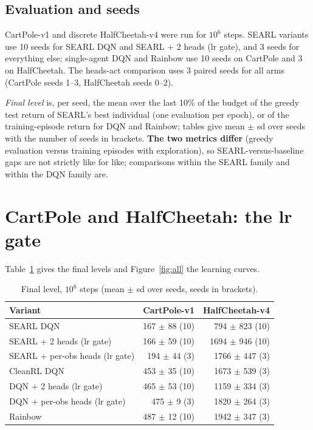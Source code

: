 \documentclass[11pt]{article}
\begin{document}
\subsection{Evaluation and seeds}
CartPole-v1 and discrete HalfCheetah-v4 were run for $10^6$ steps. SEARL variants use 10 seeds for
SEARL DQN and SEARL + 2 heads (lr gate), and 3 seeds for everything else; single-agent DQN and Rainbow use 10 seeds on
CartPole and 3 on HalfCheetah. The heads-act comparison uses 3 paired seeds for all arms (CartPole seeds 1--3,
HalfCheetah seeds 0--2).

\emph{Final level} is, per seed, the mean over the last 10\% of the budget of the greedy test return of SEARL's best
individual (one evaluation per epoch), or of the training-episode return for DQN and Rainbow; tables give mean $\pm$ sd
over seeds with the number of seeds in brackets. \textbf{The two metrics differ} (greedy evaluation versus training
episodes with exploration), so SEARL-versus-baseline gaps are not strictly like for like; comparisons within the SEARL
family and within the DQN family are.

\section{CartPole and HalfCheetah: the lr gate}
Table~\ref{tab:main} gives the final levels and Figure~\ref{fig:all} the learning curves.

\begin{table}[h]
\centering\small
\begin{tabular}{lrr}
\toprule
Variant & CartPole-v1 & HalfCheetah-v4 \\
\midrule
SEARL DQN & 167 $\pm$ 88 (10) & 794 $\pm$ 823 (10) \\
SEARL + 2 heads (lr gate) & 166 $\pm$ 59 (10) & 1694 $\pm$ 946 (10) \\
SEARL + per-obs heads (lr gate) & 194 $\pm$ 44 (3) & 1766 $\pm$ 447 (3) \\
\midrule
CleanRL DQN & 453 $\pm$ 35 (10) & 1673 $\pm$ 539 (3) \\
DQN + 2 heads (lr gate) & 465 $\pm$ 53 (10) & 1159 $\pm$ 334 (3) \\
DQN + per-obs heads (lr gate) & 475 $\pm$ 9 (3) & 1820 $\pm$ 264 (3) \\
\midrule
Rainbow & 487 $\pm$ 12 (10) & 1942 $\pm$ 347 (3) \\
\bottomrule
\end{tabular}
\caption{Final level, $10^6$ steps (mean $\pm$ sd over seeds, seeds in brackets).}
\label{tab:main}
\end{table}
\end{document}

